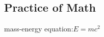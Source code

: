 \documentclass{article}
\begin{document}
\subsection{Practice of Math}

mass-energy equation:$E=mc^2$
\end{document}
